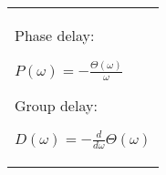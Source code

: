 \begin{tabular}{@{}L@{}}
Phase delay: 

$P(\omega) = 
- \frac{\Theta(\omega)}{\omega}
$

Group delay:

$D(\omega) =
- \frac{d}{d\omega} \Theta(\omega)
$
\end{tabular}
